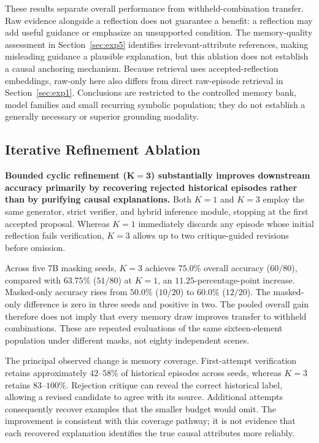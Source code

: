 \documentclass[journal]{IEEEtran}
\theoremstyle{definition}
\theoremstyle{remark}
\begin{document}
These results separate overall performance from withheld-combination transfer. Raw evidence alongside a reflection does not guarantee a benefit: a reflection may add useful guidance or emphasize an unsupported condition. The memory-quality assessment in Section~\ref{sec:exp5} identifies irrelevant-attribute references, making misleading guidance a plausible explanation, but this ablation does not establish a causal anchoring mechanism. Because retrieval uses accepted-reflection embeddings, raw-only here also differs from direct raw-episode retrieval in Section~\ref{sec:exp1}. Conclusions are restricted to the controlled memory bank, model families and small recurring symbolic population; they do not establish a generally necessary or superior grounding modality.

\subsection{Iterative Refinement Ablation}
\label{sec:exp3}

\textbf{Bounded cyclic refinement ($\boldsymbol{K=3}$) substantially improves downstream accuracy primarily by recovering rejected historical episodes rather than by purifying causal explanations.} Both $K=1$ and $K=3$ employ the same generator, strict verifier, and hybrid inference module, stopping at the first accepted proposal. Whereas $K=1$ immediately discards any episode whose initial reflection fails verification, $K=3$ allows up to two critique-guided revisions before omission.

Across five 7B masking seeds, $K=3$ achieves $75.0\%$ overall accuracy ($60/80$), compared with $63.75\%$ ($51/80$) at $K=1$, an $11.25$-percentage-point increase. Masked-only accuracy rises from $50.0\%$ ($10/20$) to $60.0\%$ ($12/20$). The masked-only difference is zero in three seeds and positive in two. The pooled overall gain therefore does not imply that every memory draw improves transfer to withheld combinations. These are repeated evaluations of the same sixteen-element population under different masks, not eighty independent scenes.

The principal observed change is memory coverage. First-attempt verification retains approximately $42$--$58\%$ of historical episodes across seeds, whereas $K=3$ retains $83$--$100\%$. Rejection critique can reveal the correct historical label, allowing a revised candidate to agree with its source. Additional attempts consequently recover examples that the smaller budget would omit. The improvement is consistent with this coverage pathway; it is not evidence that each recovered explanation identifies the true causal attributes more reliably.
\end{document}
